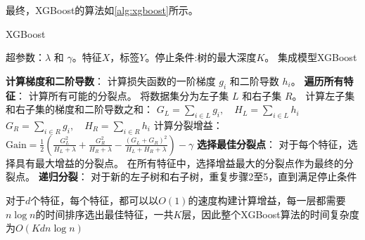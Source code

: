 最终，XGBoost的算法如\autoref{alg:xgboost}所示。
\begin{algorithm}[H]
	\caption{XGBoost}
	\label{alg:xgboost}
	\begin{algorithmic}[1]
		\REQUIRE 超参数：$\lambda$ 和 $\gamma$。特征$X$，标签$Y$。停止条件:树的最大深度$K$。
		\ENSURE 集成模型XGBoost

		\STATE \textbf{计算梯度和二阶导数}：
		\STATE 计算损失函数的一阶梯度 $g_i$ 和二阶导数 $h_i$。
		\ENDFOR
		\STATE \textbf{遍历所有特征}：
		\STATE 计算所有可能的分裂点。
		\STATE 将数据集分为左子集 $L$ 和右子集 $R$。
		\STATE 计算左子集和右子集的梯度和二阶导数之和：
		\STATE $G_L = \sum_{i \in L} g_i, \quad H_L = \sum_{i \in L} h_i$
		\STATE $G_R = \sum_{i \in R} g_i, \quad H_R = \sum_{i \in R} h_i$
		\STATE 计算分裂增益：
		\STATE $\text{Gain} = \frac{1}{2}\left(\frac{G_L^2}{H_L + \lambda} + \frac{G_R^2}{H_R + \lambda} - \frac{(G_L + G_R)^2}{H_L + H_R + \lambda}\right) - \gamma$
		\ENDFOR
		\ENDFOR
		\STATE \textbf{选择最佳分裂点}：
		\STATE 对于每个特征，选择具有最大增益的分裂点。
		\STATE 在所有特征中，选择增益最大的分裂点作为最终的分裂点。
		\STATE \textbf{递归分裂}：
		\STATE 对于新的左子树和右子树，重复步骤2至5，直到满足停止条件
	\end{algorithmic}
\end{algorithm}
\par
对于$d$个特征，每个特征，都可以以$O(1)$的速度构建计算增益，每一层都需要$n\log n$的时间排序选出最佳特征，一共$K$层，因此整个XGBoost算法的时间复杂度为$O(Kdn\log{n})$
